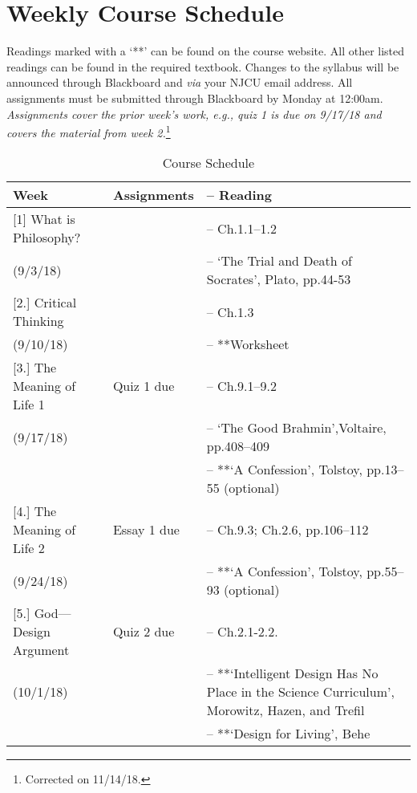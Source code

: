 \documentclass[article,oneside]{memoir}
\begin{document}
\section{Weekly Course Schedule}
Readings marked with a `**' can be found on the course website. All other listed readings can be found in the required textbook. Changes to the syllabus will be announced through Blackboard and \emph{via} your NJCU email address.  All assignments must be submitted through Blackboard by Monday at 12:00am. \emph{Assignments cover the prior week's work, e.g., quiz 1 is due on 9/17/18 and covers the material from week 2.}\footnote{Corrected on 11/14/18.}

\begin{center}
\begin{longtable}{p{4.5cm}p{2cm}>{-- }p{6cm}}
 
  \caption{Course Schedule} \\
  \toprule
  \textbf{Week} &\textbf{Assignments } & \textbf{Reading} \\
  \midrule

  

[1] What is Philosophy?		& 	 			& Ch.1.1--1.2  \\
(9/3/18)					&				&  `The Trial and Death of Socrates', Plato, pp.44-53   \\  [1.8\baselineskip]

[2.] Critical Thinking		 	& 				&  Ch.1.3 \\
(9/10/18)					&				&  **Worksheet \\  [1.8\baselineskip]

[3.] The Meaning of Life 1		& Quiz 1 due			&  Ch.9.1--9.2 \\
(9/17/18)					&				&  `The Good Brahmin',Voltaire, pp.408--409 \\
						&				& **`A Confession', Tolstoy, pp.13--55 (optional)\\ [1.8\baselineskip]
	
[4.] The Meaning of Life 2		& Essay 1	due		&  Ch.9.3;  Ch.2.6, pp.106--112\\
(9/24/18)					& 				&  **`A Confession', Tolstoy, pp.55--93 (optional) \\  [1.8\baselineskip]

[5.] God---Design Argument 	& Quiz 2 due		& Ch.2.1-2.2.\\ 
(10/1/18)					&				& **`Intelligent Design Has No Place in the Science Curriculum', Morowitz, Hazen, and Trefil\\
						&				& **`Design for Living', Behe\\   [1.8\baselineskip]


\end{longtable}
\end{center}
\end{document}
